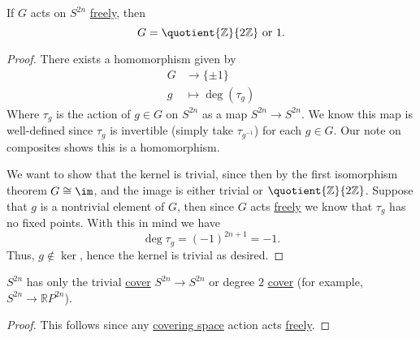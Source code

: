 \begin{theorem}\label{thm:actions-on-spheres}
	If \(G\) acts on \(S^{2n}\) \hyperref[def:free-group]{freely}, then
	\[
		G = \quotient{\mathbb{Z}}{2\mathbb{Z}} \text{ or } 1.
	\]
\end{theorem}
\begin{proof}
	There exists a homomorphism given by
	\[
		\begin{split}
			G & \to \{\pm 1\}        \\
			g & \mapsto \deg(\tau_g)
		\end{split}
	\]
	Where \(\tau_g\) is the action of \(g \in G\) on \(S^{2n}\) as a map \(S^{2n} \to S^{2n}\). We know this map is well-defined since \(\tau_g\) is invertible
	(simply take \(\tau_{g^{-1}}\)) for each \(g \in G\). Our note on composites shows this is a homomorphism.

	We want to show that the kernel is trivial, since then by the first isomorphism theorem \(G \cong \im\), and the image is either trivial or
	\(\quotient{\mathbb{Z}}{2\mathbb{Z}}\). Suppose that \(g\) is a nontrivial element of \(G\), then since \(G\) acts \hyperref[def:free-group]{freely} we know that
	\(\tau_g\) has no fixed points. With this in mind we have
	\[
		\deg \tau_g = (-1)^{2n + 1} = - 1.
	\]
	Thus, \(g \not\in \ker\), hence the kernel is trivial as desired.
\end{proof}

\begin{corollary}
	\(S^{2n}\) has only the trivial \hyperref[def:covering-space]{cover} \(S^{2n} \to S^{2n}\) or degree
	\(2\) \hyperref[def:covering-space]{cover} (for example, \(S^{2n} \to \mathbb{R}P^{2n}\)).
\end{corollary}
\begin{proof}
	This follows since any \hyperref[def:covering-space]{covering space} action acts \hyperref[def:free-group]{freely}.
\end{proof}

